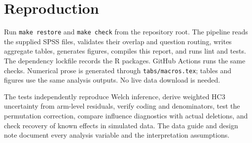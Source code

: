 \documentclass[11pt]{article}
\begin{document}
\section{Reproduction}
Run \texttt{make restore} and \texttt{make check} from the repository root.
The pipeline reads the supplied SPSS files, validates their overlap and question
routing, writes aggregate tables, generates figures, compiles this report, and
runs lint and tests. The dependency lockfile records the R packages.
GitHub Actions runs the same checks.
Numerical prose is generated through \texttt{tabs/macros.tex}; tables and figures
use the same analysis outputs. No live data download is needed.

The tests independently reproduce Welch inference, derive weighted HC3
uncertainty from arm-level residuals, verify coding and denominators, test the
permutation correction, compare influence diagnostics with actual deletions,
and check recovery of known effects in simulated data. The data guide and
design note document every analysis variable and the interpretation assumptions.
\end{document}
